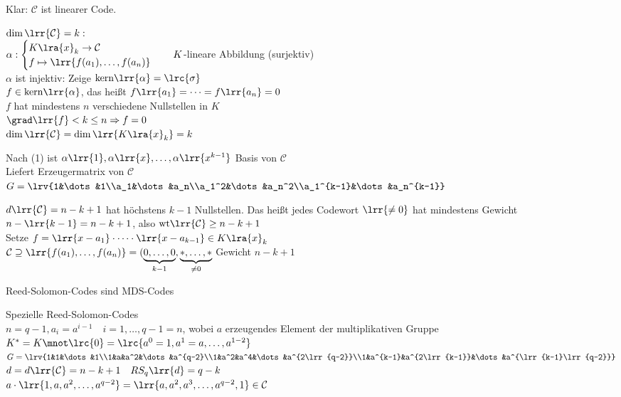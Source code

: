 				Klar: $\mathcal{C}$ ist linearer Code.
			
					\item $\dim\lrr{\mathcal{C}}=k:$\\
						$\alpha:\begin{cases}K\lra{x}_k\rightarrow\mathcal{C}\\f\mapsto\lrr{f(a_1),\dots,f(a_n)}\end{cases}\quad K$-lineare Abbildung (surjektiv)\\
						$\alpha$ ist injektiv: Zeige $\mbox{kern}\lrr{\alpha}=\lrc{\sigma}$\\
						$f\in\mbox{kern}\lrr{\alpha}$, das heißt $f\lrr{a_1}=\dots=f\lrr{a_n}=0$\\
						$f$ hat mindestens $n$ verschiedene Nullstellen in $K$\\
						$\grad\lrr{f}<k\leq n\Rightarrow f=0$\\
						$\dim\lrr{\mathcal{C}}=\dim\lrr{K\lra{x}_k}=k$
					\item Nach (1) ist $\alpha\lrr{1},\alpha\lrr{x},\dots,\alpha\lrr{x^{k-1}}$ Basis von $\mathcal{C}$\\
						Liefert Erzeugermatrix von $\mathcal{C}$\\
						$G=\lrv{1&\dots&1\\a_1&\dots&a_n\\a_1^2&\dots&a_n^2\\a_1^{k-1}&\dots&a_n^{k-1}}$
					\item $d\lrr{\mathcal{C}}=n-k+1$ hat höchstens $k-1$ Nullstellen. Das heißt jedes Codewort $\lrr{\neq 0}$ hat mindestens Gewicht $n-\lrr{k-1}=n-k+1$, also $\mbox{wt}\lrr{\mathcal{C}}\geq n-k+1$\\
						Setze $f=\lrr{x-a_1}\cdot\dots\cdot\lrr{x-a_{k-1}}\in K\lra{x}_k$\\
						$\mathcal{C}\supseteq\lrr{f(a_1),\dots,f(a_n)}=(\underbrace{0,\dots,0}_{k-1},\underbrace{*,\dots,*}_{\neq 0}$ Gewicht $n-k+1$
					\item Reed-Solomon-Codes sind MDS-Codes
				\subExEnd
			\item Spezielle Reed-Solomon-Codes\\
				$n=q-1, a_i=a^{i-1}\quad i=1,\dots, q-1=n$, wobei $a$ erzeugendes Element der multiplikativen Gruppe $K^*=K\mnot\lrc{0}=\lrc{a^0=1,a^1=a,\dots,a^{1-2}}$\\
				$G=\lrv{1&1&\dots&1\\1&a&a^2&\dots&a^{q-2}\\1&a^2&a^4&\dots&a^{2\lrr{q-2}}\\1&a^{k-1}&a^{2\lrr{k-1}}&\dots&a^{\lrr{k-1}\lrr{q-2}}}$\\
				$d=d\lrr{\mathcal{C}}=n-k+1\quad RS_q\lrr{d}=q-k$\\
				$a\cdot\lrr{1,a,a^2,\dots, a^{q-2}}=\lrr{a,a^2,a^3,\dots,a^{q-2},1}\in\mathcal{C}$
			
